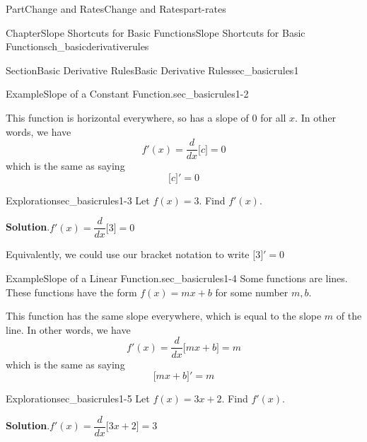 \documentclass{tufte-book}
\newcommand{\blocktitlefont}{\relax}
\numberwithin{equation}{chapter}
\newcommand{\ddx}[1]{ \dfrac{d}{dx} \Big[ #1 \Big]  }
\newcommand{\D}[1]{ \Big[ #1 \Big]'  }
\begin{document}
\begin{partptx}{Part}{Change and Rates}{}{Change and Rates}{}{}{part-rates}
\begin{chapterptx}{Chapter}{Slope Shortcuts for Basic Functions}{}{Slope Shortcuts for Basic Functions}{}{}{ch_basicderivativerules}
\begin{sectionptx}{Section}{Basic Derivative Rules}{}{Basic Derivative Rules}{}{}{sec_basicrules1}
\begin{example}{Example}{Slope of a Constant Function.}{sec_basicrules1-2}
\begin{image}{0.25}{0.5}{0.25}{}
{
}%
\end{image}%
 This function is horizontal everywhere, so has a slope of \(0\) for all \(x\).  In other words, we have%
\begin{equation*}
f'(x) = \ddx{c} = 0 
\end{equation*}
which is the same as saying%
\begin{equation*}
\D{ c } = 0
\end{equation*}
%
\end{example}
\begin{exploration}{Exploration}{}{sec_basicrules1-3}%
Let \(f(x) = 3\).  Find \(f'(x)\).%
\par\smallskip%
\noindent\textbf{\blocktitlefont Solution}.\hypertarget{sec_basicrules1-3-2}{}\quad{}\(f'(x) = \ddx{3} = 0\)%
\par
Equivalently, we could use our bracket notation to write \(\D{ 3 } = 0\)%
\end{exploration}%
\begin{example}{Example}{Slope of a Linear Function.}{sec_basicrules1-4}%
Some functions are lines.  These functions have the form \(f(x) = m x + b\) for some number \(m,b\). \begin{image}{0.25}{0.5}{0.25}{}%
%
\end{image}%
 This function has the same slope everywhere, which is equal to the slope \(m\) of the line.  In other words, we have%
\begin{equation*}
f'(x) = \ddx{ m x + b } = m  
\end{equation*}
which is the same as saying%
\begin{equation*}
\D{ m x + b} = m
\end{equation*}
%
\end{example}
\begin{exploration}{Exploration}{}{sec_basicrules1-5}%
Let \(f(x) = 3x + 2\).  Find \(f'(x) \).%
\par\smallskip%
\noindent\textbf{\blocktitlefont Solution}.\hypertarget{sec_basicrules1-5-2}{}\quad{}\(f'(x) = \ddx{3x + 2} = 3\)%

\end{exploration}
\end{sectionptx}
\end{chapterptx}
\end{partptx}
\end{document}
